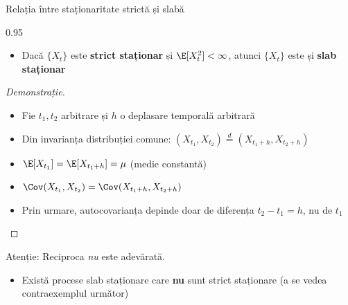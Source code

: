 \documentclass[9pt, aspectratio=169, t]{beamer}
\begin{document}
\begin{frame}{Relația între staționaritate strictă și slabă}
    \begin{cminipage}{0.95\textwidth}
        \vspace{-0.2cm}
        {\footnotesize
        \begin{thm}
            \begin{itemize}\setlength{\itemsep}{0pt}
                \item Dacă $\{X_t\}$ este \textbf{strict staționar} și $\E[X_t^2] < \infty$, atunci $\{X_t\}$ este și \textbf{slab staționar}
            \end{itemize}
        \end{thm}

        \begin{proof}[Demonstrație]
            \begin{itemize}\setlength{\itemsep}{0pt}
                \item Fie $t_1, t_2$ arbitrare și $h$ o deplasare temporală arbitrară
                \item Din invarianța distribuției comune: $(X_{t_1}, X_{t_2}) \stackrel{d}{=} (X_{t_1+h}, X_{t_2+h})$
                \item $\E[X_{t_1}] = \E[X_{t_1+h}] = \mu$ (medie constantă)
                \item $\Cov(X_{t_1}, X_{t_2}) = \Cov(X_{t_1+h}, X_{t_2+h})$
                \item Prin urmare, autocovarianța depinde doar de diferența $t_2 - t_1 = h$, nu de $t_1$
            \end{itemize}
        \end{proof}

        \begin{alertblock}{Atenție: Reciproca \emph{nu} este adevărată.}
            \begin{itemize}\setlength{\itemsep}{0pt}
                \item Există procese slab staționare care \textbf{nu} sunt strict staționare (a se vedea contraexemplul următor)
            \end{itemize}
        \end{alertblock}
        }
    \end{cminipage}
\end{frame}
\end{document}

